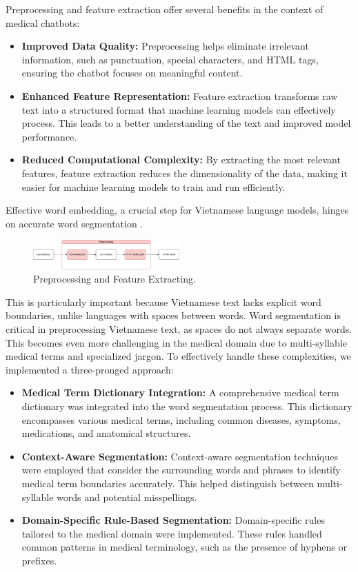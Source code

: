 \documentclass[conference]{IEEEtran}
\begin{document}
    Preprocessing and feature extraction offer several benefits in the context of medical chatbots:
        \begin{itemize}
            \item \textbf{Improved Data Quality:} Preprocessing helps eliminate irrelevant information, such as punctuation, special characters, and HTML tags, ensuring the chatbot focuses on meaningful content.
            \item \textbf{Enhanced Feature Representation:} Feature extraction transforms raw text into a structured format that machine learning models can effectively process. This leads to a better understanding of the text and improved model performance.
            \item \textbf{Reduced Computational Complexity:} By extracting the most relevant features, feature extraction reduces the dimensionality of the data, making it easier for machine learning models to train and run efficiently.
        \end{itemize}

    Effective word embedding, a crucial step for Vietnamese language models, hinges on accurate word segmentation \cite{cong2016state}.
    \begin{figure}[!htbp]
        \centerline{\includegraphics[width=0.5\textwidth]{Figures/preprocessing.png}}
        \caption{Preprocessing and Feature Extracting.}
    \label{Fig. 3}
    \end{figure}

    This is particularly important because Vietnamese text lacks explicit word boundaries, unlike languages with spaces between words. Word segmentation is critical in preprocessing Vietnamese text, as spaces do not always separate words. This becomes even more challenging in the medical domain due to multi-syllable medical terms and specialized jargon. To effectively handle these complexities, we implemented a three-pronged approach:
    
    \begin{itemize}
        \item \textbf{Medical Term Dictionary Integration:} A comprehensive medical term dictionary was integrated into the word segmentation process. This dictionary encompasses various medical terms, including common diseases, symptoms, medications, and anatomical structures.
        \item \textbf{Context-Aware Segmentation:} Context-aware segmentation techniques were employed that consider the surrounding words and phrases to identify medical term boundaries accurately. This helped distinguish between multi-syllable words and potential misspellings.
        \item \textbf{Domain-Specific Rule-Based Segmentation:} Domain-specific rules tailored to the medical domain were implemented. These rules handled common patterns in medical terminology, such as the presence of hyphens or prefixes.
    \end{itemize}
\end{document}
